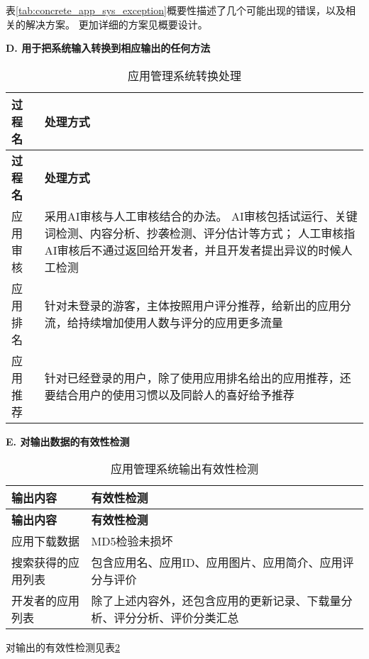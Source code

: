表\ref{tab:concrete_app_sys_exception}概要性描述了几个可能出现的错误，以及相关的解决方案。
更加详细的方案见概要设计。


\textbf{D. 用于把系统输入转换到相应输出的任何方法}

\begin{longtable}{|p{3cm}|p{11cm}|}
\caption{应用管理系统转换处理}\label{tab:concrete_app_sys_transform} \\
\hline
\textbf{过程名} & \textbf{处理方式} \\
\hline
\endfirsthead
\hline
\textbf{过程名} & \textbf{处理方式}\\
\hline
\endhead
\hline 
\endfoot
\hline
\endlastfoot
应用审核 & 采用AI审核与人工审核结合的办法。 AI审核包括试运行、关键词检测、内容分析、抄袭检测、评分估计等方式；
人工审核指AI审核后不通过返回给开发者，并且开发者提出异议的时候人工检测\\
应用排名 & 针对未登录的游客，主体按照用户评分推荐，给新出的应用分流，给持续增加使用人数与评分的应用更多流量 \\
应用推荐 & 针对已经登录的用户，除了使用应用排名给出的应用推荐，还要结合用户的使用习惯以及同龄人的喜好给予推荐 \\

\end{longtable}
		
\textbf{E.	对输出数据的有效性检测}

\begin{longtable}{|p{3cm}|p{11cm}|}
\caption{应用管理系统输出有效性检测}\label{tab:concrete_app_sys_output_valid} \\
\hline
\textbf{输出内容} & \textbf{有效性检测}    \\
\hline
\endfirsthead
\hline
\textbf{输出内容} & \textbf{有效性检测}   \\
\hline
\endhead
\hline 
\endfoot
\hline
\endlastfoot
应用下载数据 & MD5检验未损坏 \\
搜索获得的应用列表 & 包含应用名、应用ID、应用图片、应用简介、应用评分与评价\\
开发者的应用列表 & 除了上述内容外，还包含应用的更新记录、下载量分析、评分分析、评价分类汇总\\
\end{longtable}
对输出的有效性检测见表\ref{tab:concrete_app_sys_output_valid}


